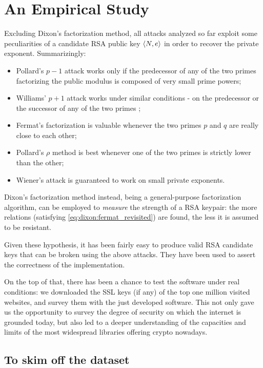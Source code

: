 \chapter{An Empirical Study \label{chap:empirical_study}}

Excluding Dixon's factorization method, all attacks analyzed so far exploit
some peculiarities of a candidate RSA public key $\langle N, e\rangle$ in order to
recover the private exponent.
Summarizingly:
\begin{itemize}
  \item Pollard's $p-1$ attack works only if the predecessor of any of
    the two primes factorizing the public modulus is composed of very small
    prime powers;
  \item  Williams' $p+1$ attack works under similar conditions - on the
    predecessor or the successor of any of the two primes ;
  \item Fermat's factorization is valuable whenever the two primes $p$ and $q$
    are really close to each other;
  \item Pollard's $\rho$ method is best whenever one of the two primes is
    strictly lower than the other;
  \item Wiener's attack is guaranteed to work on small private exponents.
\end{itemize}
Dixon's factorization method instead, being a general-purpose factorization
algorithm, can be employed to \emph{measure} the strength of a RSA
keypair: the more relations (satisfying \ref{eq:dixon:fermat_revisited}) are
found, the less it is assumed to be resistant.

Given these hypothesis, it has been fairly easy to produce valid RSA candidate
keys that can be broken using the above attacks. They have been used to assert
the correctness of the implementation.

On the top of that, there has been a chance to test the software under real
conditions: we downloaded the SSL keys (if any) of the top one million visited
websites, and survey them with the just developed software. This not only gave
us the opportunity to survey the degree of security on which the internet is
grounded today, but also led to a deeper understanding of the capacities and limits of
the most widespread libraries offering crypto nowadays.

\vfill
\section{To skim off the dataset}

